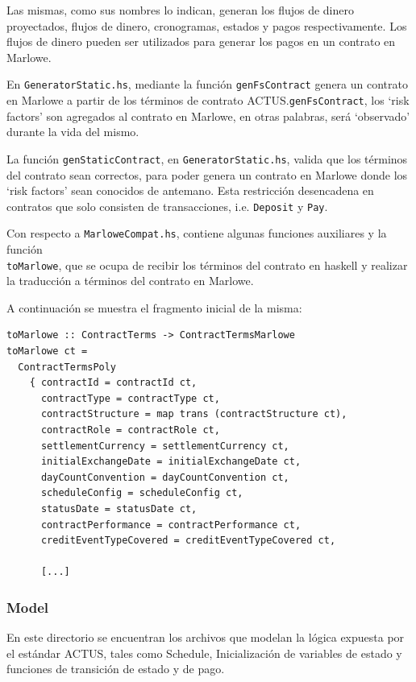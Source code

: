 \documentclass[12pt]{book}
\begin{document}
Las mismas, como sus nombres lo indican, generan los flujos de dinero proyectados, flujos de dinero, cronogramas, estados y pagos respectivamente. Los flujos de dinero pueden ser utilizados para generar los pagos en un contrato en Marlowe.

En \texttt{GeneratorStatic.hs}, mediante la función \texttt{genFsContract} genera un contrato en Marlowe a partir de los términos de contrato ACTUS.\@En \texttt{genFsContract}, los `risk factors' son agregados al contrato en Marlowe, en otras palabras, será `observado' durante la vida del mismo.

La función \texttt{genStaticContract}, en \texttt{GeneratorStatic.hs}, valida que los términos del contrato sean correctos, para poder genera un contrato en Marlowe donde los `risk factors' sean conocidos de antemano. Esta restricción desencadena en contratos que solo consisten de transacciones, i.e. \texttt{Deposit} y \texttt{Pay}.

Con respecto a \texttt{MarloweCompat.hs}, contiene algunas funciones auxiliares y la función\\ \texttt{toMarlowe}, que se ocupa de recibir los términos del contrato en haskell y realizar la traducción a términos del contrato en Marlowe. 

A continuación se muestra el fragmento inicial de la misma:


\begin{lstlisting}[style=Haskell-cardano, caption=Comienzo de la función \texttt{toMarlowe}.]
toMarlowe :: ContractTerms -> ContractTermsMarlowe
toMarlowe ct =
  ContractTermsPoly
    { contractId = contractId ct,
      contractType = contractType ct,
      contractStructure = map trans (contractStructure ct),
      contractRole = contractRole ct,
      settlementCurrency = settlementCurrency ct,
      initialExchangeDate = initialExchangeDate ct,
      dayCountConvention = dayCountConvention ct,
      scheduleConfig = scheduleConfig ct,
      statusDate = statusDate ct,
      contractPerformance = contractPerformance ct,
      creditEventTypeCovered = creditEventTypeCovered ct,

      [...]
\end{lstlisting}

\subsubsection{Model}

En este directorio se encuentran los archivos que modelan la lógica expuesta por el estándar ACTUS, tales como Schedule, Inicialización de variables de estado y funciones de transición de estado y de pago.
\end{document}

